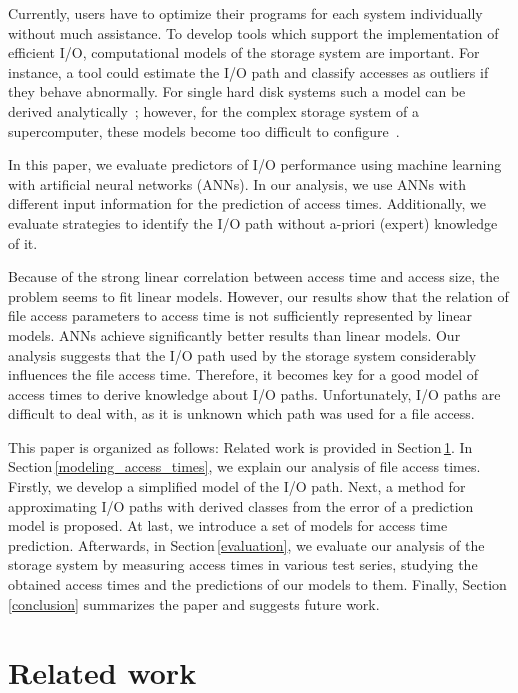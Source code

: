 \documentclass{superfri}
\begin{document}
	Currently, users have to optimize their programs for each system individually without much assistance.
	To develop tools which support the implementation of efficient I/O, computational models of the storage system are important.
	For instance, a tool could estimate the I/O path and classify accesses as outliers if they behave abnormally.
	For single hard disk systems such a model can be derived analytically~\cite{Ruemmler94anintroduction}; however, for the complex storage system of a supercomputer, these models become too difficult to configure~\cite{DBLP:conf/npc/ZhangLZJC10}.
	
	In this paper, we evaluate predictors of I/O performance using machine learning with artificial neural networks (ANNs).
	In our analysis, we use ANNs with different input information for the prediction of access times.
	Additionally, we evaluate strategies to identify the I/O path without a-priori (expert) knowledge of it.
	
	Because of the strong linear correlation between access time and access size, the problem seems to fit linear models.
	However, our results show that the relation of file access parameters to access time is not sufficiently represented by linear models.
	ANNs achieve significantly better results than linear models.
	Our analysis suggests that the I/O path used by the storage system considerably influences the file access time.
	Therefore, it becomes key for a good model of access times to derive knowledge about I/O paths.
	Unfortunately, I/O paths are difficult to deal with, as it is unknown which path was used for a file access.
	
	This paper is organized as follows:
	Related work is provided in Section\,\ref{sec:related}.
	In Section\,\ref{modeling_access_times}, we explain our analysis of file access times. 
	Firstly, we develop a simplified model of the I/O path. 
	Next, a method for approximating I/O paths with derived classes from the error of a prediction model is proposed. 
	At last, we introduce a set of models for access time prediction.
	Afterwards, in Section\,\ref{evaluation}, we evaluate our analysis of the storage system by measuring access times in various test series, studying the obtained access times and the predictions of our models to them.
	Finally, Section\,\ref{conclusion} summarizes the paper and suggests future work.
	
	\section{Related work}
	\label{sec:related}
	
\end{document}
